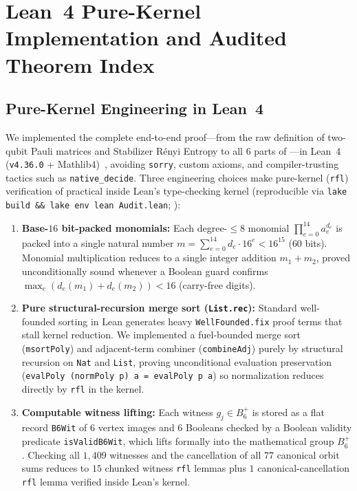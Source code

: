 \documentclass[11pt,a4paper]{article}
\theoremstyle{plain}
\theoremstyle{definition}
\theoremstyle{remark}
\newcommand{\Bplus}{B_6^+}
\newcommand{\code}[1]{\texttt{\small #1}}
\begin{document}
\section{Lean~4 Pure-Kernel Implementation and Audited Theorem Index}
\label{app:lean}

\subsection{Pure-Kernel Engineering in Lean~4}
We implemented the complete end-to-end proof---from the raw definition of two-qubit Pauli matrices and Stabilizer R\'enyi Entropy to all $6$ parts of ---in Lean~4 (\code{v4.36.0} + Mathlib4)~\cite{deMouraUllrich2021,Mathlib2020}, avoiding \code{sorry}, custom axioms, and compiler-trusting tactics such as \code{native\_decide}. Three engineering choices make pure-kernel (\code{rfl}) verification of  practical inside Lean's type-checking kernel (reproducible via \code{lake build \&\& lake env lean Audit.lean}; ):

\begin{enumerate}[label=\arabic*., leftmargin=1.8em, itemsep=2pt]
  \item \textbf{Base-$16$ bit-packed monomials:} Each degree-$\le 8$ monomial $\prod_{e=0}^{14} a_e^{d_e}$ is packed into a single natural number $m = \sum_{e=0}^{14} d_e \cdot 16^e < 16^{15}$ ($60$ bits). Monomial multiplication reduces to a single integer addition $m_1 + m_2$, proved unconditionally sound whenever a Boolean guard confirms $\max_e(d_e(m_1) + d_e(m_2)) < 16$ (carry-free digits).
  \item \textbf{Pure structural-recursion merge sort (\code{List.rec}):} Standard well-founded sorting in Lean generates heavy \code{WellFounded.fix} proof terms that stall kernel reduction. We implemented a fuel-bounded merge sort (\code{msortPoly}) and adjacent-term combiner (\code{combineAdj}) purely by structural recursion on \code{Nat} and \code{List}, proving unconditional evaluation preservation (\code{evalPoly (normPoly p) a = evalPoly p a}) so normalization reduces directly by \code{rfl} in the kernel.
  \item \textbf{Computable witness lifting:} Each witness $g_j \in \Bplus$ is stored as a flat record \code{B6Wit} of $6$ vertex images and $6$ Booleans checked by a Boolean validity predicate \code{isValidB6Wit}, which lifts formally into the mathematical group $\Bplus$. Checking all $1{,}409$ witnesses and the cancellation of all $77$ canonical orbit sums reduces to $15$ chunked witness \code{rfl} lemmas plus $1$ canonical-cancellation \code{rfl} lemma verified inside Lean's kernel.
\end{enumerate}
\end{document}
